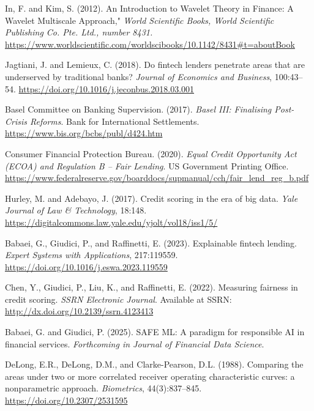 \documentclass[a4paper,11pt,twoside]{article}
\newcommand{\0}{\Bf{0}}
\theoremstyle{definition}
\begin{document}
{\begin{thebibliography}{99}
{ In, F. and Kim, S. (2012). An Introduction to Wavelet Theory in Finance: A Wavelet Multiscale Approach,"  \emph{World Scientific Books, World Scientific Publishing Co. Pte. Ltd., number 8431.}
\url{https://www.worldscientific.com/worldscibooks/10.1142/8431#t=aboutBook}

 Jagtiani, J. and Lemieux, C. (2018). Do fintech lenders penetrate areas that are underserved by traditional banks? \emph{Journal of Economics and Business}, 100:43--54. \url{https://doi.org/10.1016/j.jeconbus.2018.03.001}

 Basel Committee on Banking Supervision. (2017). \emph{Basel III: Finalising Post-Crisis Reforms}. Bank for International Settlements. \url{https://www.bis.org/bcbs/publ/d424.htm}

 Consumer Financial Protection Bureau. (2020). \emph{Equal Credit Opportunity Act (ECOA) and Regulation B -- Fair Lending}. US Government Printing Office. \url{https://www.federalreserve.gov/boarddocs/supmanual/cch/fair_lend_reg_b.pdf}

 Hurley, M. and Adebayo, J. (2017). Credit scoring in the era of big data. \emph{Yale Journal of Law \& Technology}, 18:148. \url{https://digitalcommons.law.yale.edu/yjolt/vol18/iss1/5/}

\par\vspace{0.8em}

 Babaei, G., Giudici, P., and Raffinetti, E. (2023). Explainable fintech lending. \emph{Expert Systems with Applications}, 217:119559. \url{https://doi.org/10.1016/j.eswa.2023.119559}

\par\vspace{0.8em}

 Chen, Y., Giudici, P., Liu, K., and Raffinetti, E. (2022). Measuring fairness in credit scoring. \emph{SSRN Electronic Journal}. Available at SSRN:
\url{http://dx.doi.org/10.2139/ssrn.4123413}

\par\vspace{0.8em}

 Babaei, G. and Giudici, P. (2025). SAFE ML: A paradigm for responsible AI in financial services. \emph{Forthcoming in Journal of Financial Data Science}.

\par\vspace{0.8em}

 DeLong, E.R., DeLong, D.M., and Clarke-Pearson, D.L. (1988). Comparing the areas under two or more correlated receiver operating characteristic curves: a nonparametric approach. \emph{Biometrics}, 44(3):837--845. \url{https://doi.org/10.2307/2531595}

}\end{thebibliography}
}
\end{document}
